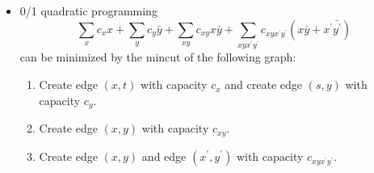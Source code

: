 \begin{itemize}
    \item 0/1 quadratic programming
    \[ \sum_x{c_xx} + \sum_y{c_y\bar{y}} + \sum_{xy}c_{xy}x\bar{y} + \sum_{xyx^\prime y^\prime}c_{xyx^\prime y^\prime}(x\bar{y} + x^\prime\bar{y^\prime}) \]
    can be minimized by the mincut of the following graph:
    \begin{enumerate}
     \item Create edge $(x, t)$ with capacity $c_x$ and create edge $(s, y)$ with capacity $c_y$.
     \item Create edge $(x, y)$ with capacity $c_{xy}$.
     \item Create edge $(x, y)$ and edge $(x^\prime, y^\prime)$ with capacity $c_{xyx^\prime y^\prime}$.
    \end{enumerate}
\end{itemize}
